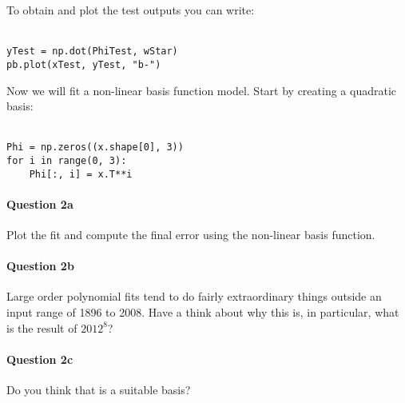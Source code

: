 \documentclass{article}
\begin{document}
To obtain and plot the test outputs you can write:\\ \ \\
\begin{verbatim}
yTest = np.dot(PhiTest, wStar)
pb.plot(xTest, yTest, "b-")
\end{verbatim}


Now we will fit a non-linear basis function model. Start by creating a quadratic
basis:\\ \ \\
\begin{verbatim}
Phi = np.zeros((x.shape[0], 3))
for i in range(0, 3):
    Phi[:, i] = x.T**i
\end{verbatim}


\paragraph{Question 2a}
Plot the fit and compute the final error using the non-linear basis
function.

\paragraph{Question 2b}
Large order polynomial fits tend to do fairly extraordinary things
outside an input range of 1896 to 2008. Have a think about why this
is, in particular, what is the result of $2012^8$?

\paragraph{Question 2c}
Do you think that is a suitable basis?
\end{document}
